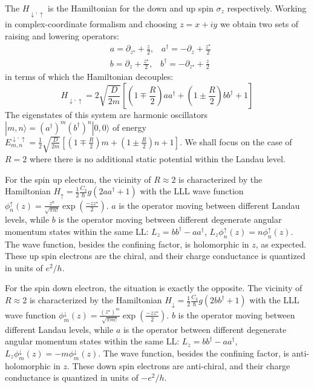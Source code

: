 \documentclass[prl,aps,amssymb,shownopacs,twocolumn]{revtex4}
\begin{document}
	\noindent The $H_{ \downarrow, \uparrow}$ is the Hamiltonian for the
	down and up spin $\sigma_z$ respectively. Working in
	complex-coordinate formalism and choosing $z = x+ i y$ we obtain two
	sets of raising and lowering operators:
	\begin{eqnarray}
		& a = \partial_{z^\star} + \frac{z}{2}, \;\;\; a^\dagger = - \partial_z + \frac{z^\star}{2} \nonumber \\
		& b = \partial_{z} + \frac{z^\star}{2}, \;\;\; b^\dagger = -
		\partial_{z^\star} + \frac{z}{2}
	\end{eqnarray}
	\noindent in terms of which the Hamiltonian decouples:
	\begin{equation}
		H_{ \downarrow, \uparrow} =2 \sqrt{\frac{D}{2m}} \left[(1 \mp
		\frac{R}{2} ) a a^\dagger + (1 \pm \frac{R}{2}) b b^\dagger  + 1
		\right]
	\end{equation}
	\noindent The eigenstates of this system are harmonic oscillators
	$|m,n\rangle = (a^\dagger)^m (b^\dagger)^n |0,0\rangle$ of energy
	$E^{ \downarrow, \uparrow}_{m,n} = \frac{1}{2} \sqrt{\frac{D}{2m}}
	\left[(1 \mp \frac{R}{2} ) m + (1 \pm \frac{R}{2}) n + 1 \right]$.
	We shall focus on the case of $R=2$ where there is no additional
	static potential within the Landau level.
	
	For the spin up electron, the vicinity of $R \approx 2$ is
	characterized by the Hamiltonian $H_{\uparrow} = \frac{1}{2}
	\frac{C_3}{\hbar} g (2 a a^\dagger + 1) $ with the LLL wave function
	$\phi^\uparrow_n(z) =\frac{z^n}{\sqrt{\pi n ! } }\exp(\frac{-z
		z^\star}{2})$. $a$ is the operator moving between different Landau
	levels, while $b$ is the operator moving between different
	degenerate angular momentum states within the same LL: $L_z= b
	b^\dagger - a a^\dagger$, $L_z \phi^\uparrow_n(z) =  n
	\phi^\uparrow_n(z)$. The wave function, besides the confining
	factor, is holomorphic in $z$, as expected. These up spin electrons
	are the chiral, and their charge conductance is quantized in units
	of $e^2/h$.
	
	
	For the spin down electron, the situation is exactly the opposite.
	The vicinity of $R \approx 2$ is characterized by the Hamiltonian
	$H_{\downarrow} = \frac{1}{2} \frac{C_3}{\hbar} g (2 b b^\dagger +
	1) $ with the LLL wave function $\phi^\downarrow_m(z)
	=\frac{(z^\star)^m}{\sqrt{\pi m ! } }\exp(\frac{-z z^\star}{2})$.
	$b$ is the operator moving between different Landau levels, while
	$a$ is the operator between different degenerate angular momentum
	states within the same LL: $L_z= b b^\dagger - a a^\dagger$, $L_z
	\phi^\downarrow_m(z) = - m \phi^\downarrow_m(z)$. The wave function,
	besides the confining factor, is anti-holomorphic in $z$. These down
	spin electrons are anti-chiral, and their charge conductance is
	quantized in units of $-e^2/h$.
	
\end{document}
